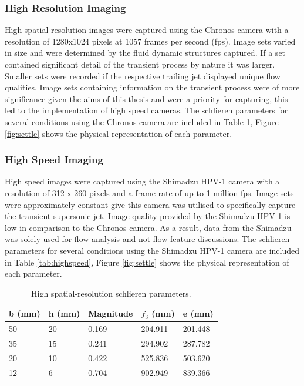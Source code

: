 \subsubsection{High Resolution Imaging}
High spatial-resolution images were captured using the Chronos camera with a resolution
of 1280x1024 pixels at 1057 frames per second (fps). Image sets varied in
size and were determined by the fluid dynamic structures captured. If a set contained significant detail of the transient process by nature it was larger. Smaller sets were recorded if the respective trailing jet displayed unique flow qualities. Image sets containing information on the transient process were of more significance given the aims of this thesis and were a priority for capturing, this led to the implementation of high speed cameras. The schlieren parameters for several conditions using the Chronos camera are included in Table \ref{tab:highres}, Figure \ref{fig:settle} shows the physical representation of each parameter.

\subsubsection{High Speed Imaging}
High speed images were captured using the Shimadzu HPV-1 camera with a resolution of 312 x 260 pixels and a frame rate of up to 1 million fps. Image sets were approximately constant give this camera was utilised to specifically capture the transient supersonic jet. Image quality provided by the Shimadzu HPV-1 is low in comparison to the Chronos camera. As a result, data from the Shimadzu was solely used for flow analysis and not flow feature discussions. The schlieren parameters for several conditions using the Shimadzu HPV-1 camera are included in Table \ref{tab:highspeed}, Figure \ref{fig:settle} shows the physical representation of each parameter.

\begin{table}[h]
\centering
\caption{High spatial-resolution schlieren parameters.}
\label{tab:highres}
\begin{tabular}{@{}lllll@{}}
\toprule
b (mm) & h (mm) & Magnitude & $f_3$ (mm) & e (mm)  \\ \midrule
50     & 20     & 0.169     & 204.911   & 201.448 \\
35     & 15     & 0.241     & 294.902   & 287.782 \\
20     & 10     & 0.422     & 525.836   & 503.620 \\
12     & 6      & 0.704     & 902.949   & 839.366 \\ \bottomrule
\end{tabular}
\end{table}

